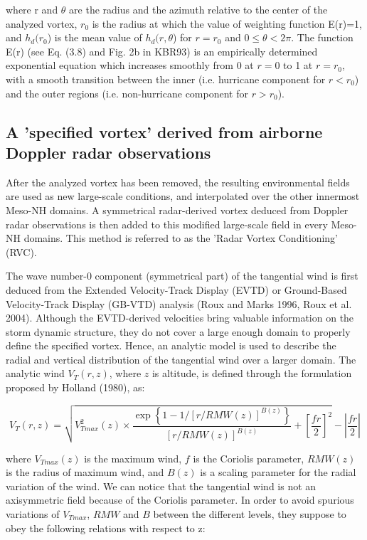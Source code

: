 where r and $\theta$ are the radius and the azimuth relative to the center  of the 
analyzed vortex, $r_{0}$ is the radius at which the value of weighting function 
E(r)=1, and $h_{d}(r_{0}$) is the mean value of $h_{d}(r,\theta$) for $r=r_{0}$ 
and $0\le\theta<2\pi$. The function E(r) (see Eq. (3.8) and Fig. 2b in 
KBR93) is an empirically determined exponential equation which increases smoothly 
from 0 at $r=0$ to 1 at $r=r_{0}$, with a smooth transition between the inner (i.e. 
hurricane component for $r<r_{0}$) and the outer regions (i.e. non-hurricane 
component for $r>r_{0}$).

\subsection{A 'specified vortex' derived from airborne Doppler radar observations}

After the analyzed vortex has been removed, the resulting environmental fields are 
used as new large-scale conditions, and interpolated over the other innermost Meso-NH 
domains. A symmetrical radar-derived vortex deduced from Doppler radar observations 
is then added to this modified large-scale field in every Meso-NH domains. This 
method is referred to as the 'Radar Vortex Conditioning' (RVC).

The wave number-0 component (symmetrical part) of the tangential wind is first 
deduced from the Extended Velocity-Track Display (EVTD) or Ground-Based 
Velocity-Track Display (GB-VTD) analysis (Roux and Marks 1996, Roux et al. 2004). Although the EVTD-derived velocities bring valuable information on the storm dynamic structure, they do not cover a large enough domain to properly define the specified vortex. Hence, an analytic model is used to describe the radial and vertical 
distribution of the tangential wind over a larger domain. The analytic wind 
$V_{T}(r,z)$, where $z$ is altitude, is defined through the 
formulation proposed by Holland (1980), as:

\begin{equation}
V_{T}(r,z)=\sqrt{ V_{Tmax}^2(z) \times \frac {\exp\left\lbrace 1- 1 / [r / RMW(z) ]^{B(z)} \right\rbrace }
{[r/RMW(z)]^{B(z)}} + \left[\frac{fr}{2}\right]^2 } - \left|\frac{fr}{2}\right|
\label{VT(r,z)}
\end{equation}

where $V_{Tmax}(z)$ is the maximum wind, $f$ is the Coriolis parameter, $RMW(z)$ is the radius of maximum wind, and $B(z)$ is a scaling parameter for the radial variation of the wind. We can notice that the tangential wind is not an axisymmetric field because of the Coriolis parameter. In order to avoid 
spurious variations of $V_{Tmax}$, $RMW$ and $B$ between the different levels, they 
suppose to obey the following relations with respect to z:

